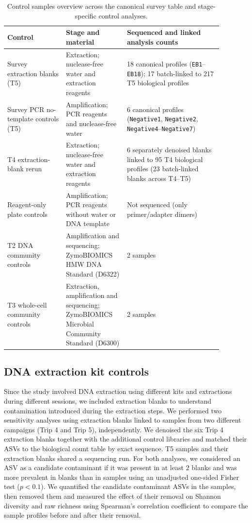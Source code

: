 \documentclass[11pt]{article}
\begin{document}
\begin{table}[htbp]\centering\small
\caption{Control samples overview across the canonical survey table and stage-specific control analyses.}
\label{tab:controls}
\begin{tabular}{p{0.24\linewidth}p{0.25\linewidth}p{0.39\linewidth}}\toprule
Control & Stage and material & Sequenced and linked analysis counts \\\midrule
Survey extraction blanks (T5) & Extraction; nuclease-free water and extraction reagents & 18 canonical profiles (\texttt{EB1}--\texttt{EB18}); 17 batch-linked to 217 T5 biological profiles \\
Survey PCR no-template controls (T5) & Amplification; PCR reagents and nuclease-free water & 6 canonical profiles (\texttt{Negative1}, \texttt{Negative2}, \texttt{Negative4}--\texttt{Negative7}) \\
T4 extraction-blank rerun & Extraction; nuclease-free water and extraction reagents & 6 separately denoised blanks linked to 95 T4 biological profiles (23 batch-linked blanks across T4--T5) \\
Reagent-only plate controls & Amplification; PCR reagents without water or DNA template & Not sequenced (only primer/adapter dimers) \\
T2 DNA community controls & Amplification and sequencing; ZymoBIOMICS HMW DNA Standard (D6322) & 2 samples \\
T3 whole-cell community controls & Extraction, amplification and sequencing; ZymoBIOMICS Microbial Community Standard (D6300) & 2 samples \\\bottomrule
\end{tabular}
\end{table}

\subsection{DNA extraction kit controls}\label{kitcontrols}
Since the study involved DNA extraction using different kits and extractions during different sessions, we included extraction blanks to understand contamination introduced during the extraction steps. We performed two sensitivity analyses using extraction blanks linked to samples from two different campaigns (Trip 4 and Trip 5), independently. We denoised the six Trip 4 extraction blanks together with the additional control libraries and matched their ASVs to the biological count table by exact sequence. T5 samples and their extraction blanks shared a sequencing run. For both analyses, we considered an ASV as a candidate contaminant if it was present in at least $2$ blanks and was more prevalent in blanks than in samples using an unadjusted one-sided Fisher test ($p<0.1$). We quantified the candidate contaminant ASVs in the samples, then removed them and measured the effect of their removal on Shannon diversity and raw richness using Spearman’s correlation coefficient to compare the sample profiles before and after their removal.
\end{document}
